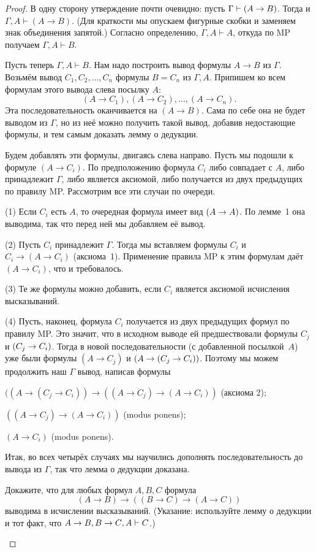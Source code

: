 \begin{proof}
В одну сторону утверждение почти очевидно: пусть $\Gamma\hm\vdash
(A\to B)$. Тогда и $\Gamma, A\vdash(A\to B)$. (Для краткости мы
опускаем фигурные скобки и заменяем знак объединения запятой.)
Согласно определению, $\Gamma, A\vdash A$, откуда по MP получаем $\Gamma,
A\vdash B$.

Пусть теперь $\Gamma,A\vdash B$. Нам надо построить вывод
формулы $A\to B$ из $\Gamma$. Возьмём вывод $C_1,C_2,\ldots,C_n$
формулы $B=C_n$ из $\Gamma, A$. Припишем ко всем формулам этого
вывода слева посылку $A$:
        $$
(A\to C_1), (A\to C_2),\dots,(A\to C_n).
        $$
Эта последовательность оканчивается на $(A\to B)$. Сама по себе
она не будет выводом из $\Gamma$, но из неё можно получить такой
вывод, добавив недостающие формулы, и тем самым доказать лемму о
дедукции.

Будем добавлять эти формулы, двигаясь слева направо. Пусть мы
подошли к формуле $(A\to C_i)$. По предположению формула $C_i$
либо совпадает с $A$, либо принадлежит $\Gamma$, либо является
аксиомой, либо получается из двух предыдущих по правилу MP.
Рассмотрим все эти случаи по очереди.

(1) Если $C_i$ есть $A$, то очередная формула имеет вид $(A\hm\to
A)$. По лемме~1 она выводима, так что перед ней мы добавляем её
вывод.

(2) Пусть $C_i$ принадлежит $\Gamma$. Тогда мы вставляем формулы
$C_i$ и $C_i\to(A\to C_i)$ (аксиома~1). Применение правила MP к
этим формулам даёт $(A\to C_i)$, что и требовалось.

(3) Те же формулы можно добавить, если $C_i$ является аксиомой
исчисления высказываний.

(4) Пусть, наконец, формула
$C_i$ получается из двух предыдущих формул
по правилу MP. Это значит, что в исходном выводе ей предшествовали
формулы
$C_j$ и $(C_j\hm\to C_i)$. Тогда в новой последовательности (с
добавленной посылкой~$A$) уже были формулы $(A\to C_j)$ и
$(A\to(C_j\hm\to C_i))$. Поэтому мы можем продолжить наш $\Gamma$\д
вывод, написав формулы

        \smallskip
\noindent
$((A\to(C_j\to C_i))\to((A\to C_j)\to (A\to C_i))$ (аксиома 2);

\noindent
$((A\to C_j)\to (A\to C_i))$ (modus ponens);

\noindent
$(A\to C_i)$ (modus ponens).
        \smallskip

Итак, во всех четырёх случаях мы научились дополнять
последовательность до вывода из $\Gamma$, так что лемма о
дедукции доказана.

\begin{problem}
Докажите, что для любых формул $A,B,C$ формула
        $$
(A\to B)\to((B\to C)\to (A\to C))
        $$
выводима в исчислении высказываний. (Указание:
используйте лемму о дедукции и тот факт, что ${A\to B}, {B\to C}, A
\hm\vdash C$.)
\end{problem}


\end{proof}
